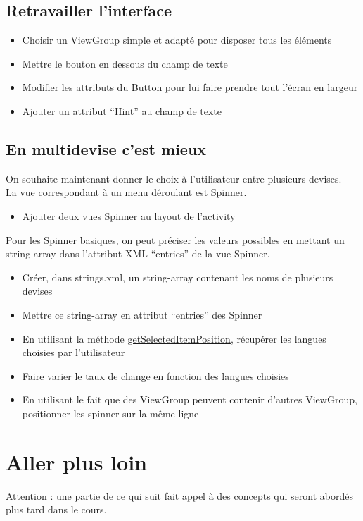 \documentclass{article}
\begin{document}
\subsection{Retravailler l'interface}
\begin{itemize}
\item Choisir un ViewGroup simple et adapté pour disposer tous les éléments
\item Mettre le bouton en dessous du champ de texte
\item Modifier les attributs du Button pour lui faire prendre tout l'écran en
largeur
\item Ajouter un attribut ``Hint'' au champ de texte
\end{itemize}
\subsection{En multidevise c'est mieux}
On souhaite maintenant donner le choix à l'utilisateur entre plusieurs
devises.\\
La vue correspondant à un menu déroulant est Spinner.
\begin{itemize}
\item Ajouter deux vues Spinner au layout de l'activity
\end{itemize}
Pour les Spinner basiques, on peut préciser les valeurs possibles en
mettant un string-array dans l'attribut XML ``entries'' de la vue Spinner.
\begin{itemize}
\item Créer, dans strings.xml, un string-array contenant les noms de plusieurs
devises
\item Mettre ce string-array en attribut ``entries'' des Spinner
\item En utilisant la méthode
\href{http://developer.android.com/reference/android/widget/AdapterView.html#getSelectedItemPosition()}{getSelectedItemPosition}, récupérer les langues choisies par l'utilisateur
\item Faire varier le taux de change en fonction des langues choisies
\item En utilisant le fait que des ViewGroup peuvent contenir d'autres
ViewGroup, positionner les spinner sur la même ligne
\end{itemize}
\section{Aller plus loin}
Attention : une partie de ce qui suit fait appel à des concepts qui seront
abordés plus tard dans le cours.
\end{document}
